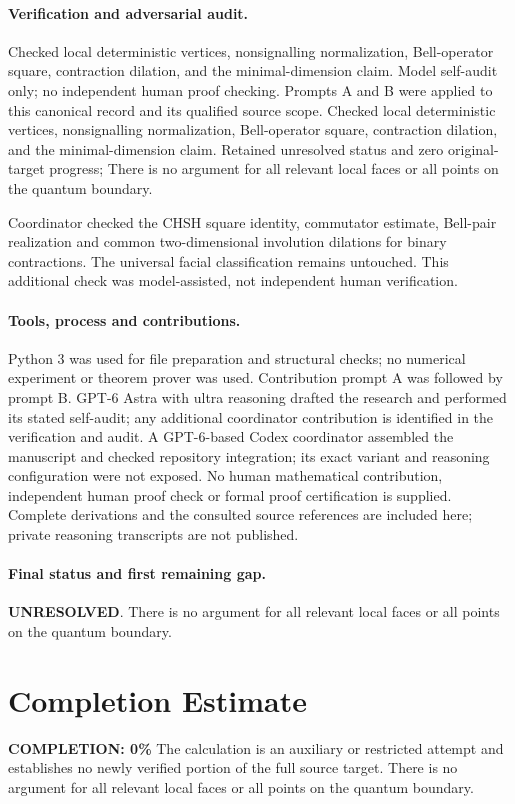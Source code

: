 \documentclass[11pt]{article}
\begin{document}
\paragraph{Verification and adversarial audit.}
Checked local deterministic vertices, nonsignalling normalization, Bell-operator square, contraction dilation, and the minimal-dimension claim. Model self-audit only; no independent human proof checking. Prompts A and B were applied to this canonical record and its qualified source scope. Checked local deterministic vertices, nonsignalling normalization, Bell-operator square, contraction dilation, and the minimal-dimension claim. Retained unresolved status and zero original-target progress; There is no argument for all relevant local faces or all points on the quantum boundary.

Coordinator checked the CHSH square identity, commutator estimate, Bell-pair realization and common two-dimensional involution dilations for binary contractions. The universal facial classification remains untouched. This additional check was model-assisted, not independent human verification.

\paragraph{Tools, process and contributions.}
Python 3 was used for file preparation and structural checks; no numerical experiment or theorem prover was used. Contribution prompt A was followed by prompt B. GPT-6 Astra with ultra reasoning drafted the research and performed its stated self-audit; any additional coordinator contribution is identified in the verification and audit. A GPT-6-based Codex coordinator assembled the manuscript and checked repository integration; its exact variant and reasoning configuration were not exposed. No human mathematical contribution, independent human proof check or formal proof certification is supplied. Complete derivations and the consulted source references are included here; private reasoning transcripts are not published.

\paragraph{Final status and first remaining gap.}
\textbf{UNRESOLVED}. There is no argument for all relevant local faces or all points on the quantum boundary.

\section{Completion Estimate}
\noindent\textbf{COMPLETION: 0\%}
The calculation is an auxiliary or restricted attempt and establishes no newly verified portion of the full source target. There is no argument for all relevant local faces or all points on the quantum boundary.
\end{document}
